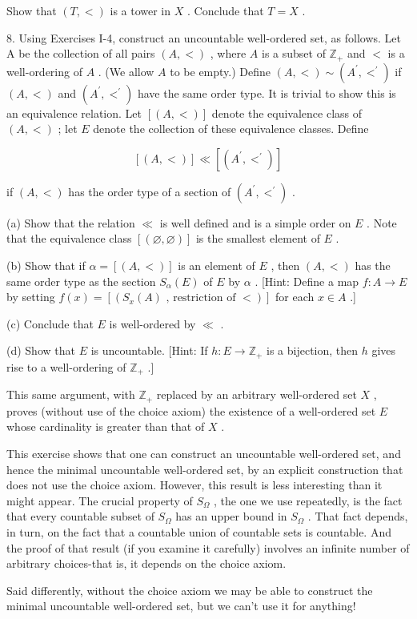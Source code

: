 \documentclass[10pt]{article}
\begin{document}
Show that \(\left( {T, < }\right)\) is a tower in \(X\) . Conclude that \(T = X\) .

8. Using Exercises I-4, construct an uncountable well-ordered set, as follows. Let A be the collection of all pairs \(\left( {A, < }\right)\) , where \(A\) is a subset of \({\mathbb{Z}}_{ + }\) and \(<\) is a well-ordering of \(A\) . (We allow \(A\) to be empty.) Define \(\left( {A, < }\right)  \sim  \left( {{A}^{\prime },{ < }^{\prime }}\right)\) if \(\left( {A, < }\right)\) and \(\left( {{A}^{\prime },{ < }^{\prime }}\right)\) have the same order type. It is trivial to show this is an equivalence relation. Let \(\left\lbrack  \left( {A, < }\right) \right\rbrack\) denote the equivalence class of \(\left( {A, < }\right)\) ; let \(E\) denote the collection of these equivalence classes. Define

\[
\left\lbrack  \left( {A, < }\right) \right\rbrack   \ll  \left\lbrack  \left( {{A}^{\prime },{ < }^{\prime }}\right) \right\rbrack
\]

if \(\left( {A, < }\right)\) has the order type of a section of \(\left( {{A}^{\prime },{ < }^{\prime }}\right)\) .

(a) Show that the relation \(\ll\) is well defined and is a simple order on \(E\) . Note that the equivalence class \(\left\lbrack  \left( {\varnothing ,\varnothing }\right) \right\rbrack\) is the smallest element of \(E\) .

(b) Show that if \(\alpha  = \left\lbrack  \left( {A, < }\right) \right\rbrack\) is an element of \(E\) , then \(\left( {A, < }\right)\) has the same order type as the section \({S}_{\alpha }\left( E\right)\) of \(E\) by \(\alpha\) . [Hint: Define a map \(f : A \rightarrow  E\) by setting \(f\left( x\right)  = \left\lbrack  \left( {{S}_{x}\left( A\right) \text{ , restriction of } < }\right) \right\rbrack\) for each \(x \in  A\) .]

(c) Conclude that \(E\) is well-ordered by \(\ll\) .

(d) Show that \(E\) is uncountable. [Hint: If \(h : E \rightarrow  {\mathbb{Z}}_{ + }\) is a bijection, then \(h\) gives rise to a well-ordering of \({\mathbb{Z}}_{ + }\) .]

This same argument, with \({\mathbb{Z}}_{ + }\) replaced by an arbitrary well-ordered set \(X\) , proves (without use of the choice axiom) the existence of a well-ordered set \(E\) whose cardinality is greater than that of \(X\) .

This exercise shows that one can construct an uncountable well-ordered set, and hence the minimal uncountable well-ordered set, by an explicit construction that does not use the choice axiom. However, this result is less interesting than it might appear. The crucial property of \({S}_{\Omega }\) , the one we use repeatedly, is the fact that every countable subset of \({S}_{\Omega }\) has an upper bound in \({S}_{\Omega }\) . That fact depends, in turn, on the fact that a countable union of countable sets is countable. And the proof of that result (if you examine it carefully) involves an infinite number of arbitrary choices-that is, it depends on the choice axiom.

Said differently, without the choice axiom we may be able to construct the minimal uncountable well-ordered set, but we can't use it for anything!
\end{document}
